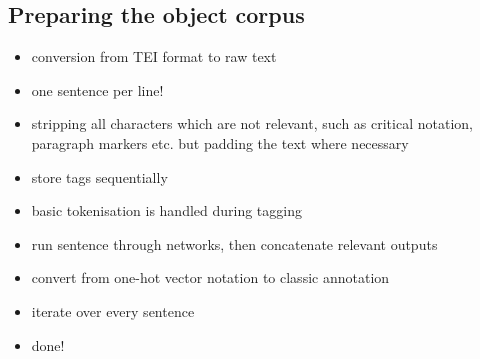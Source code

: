 \subsection{Preparing the object corpus}
\label{sec:createmodel}
\begin{itemize}
\item conversion from  TEI format to raw text
\item one sentence per line!
\item stripping all characters which are not relevant, such as
critical notation, paragraph markers etc. but padding the text where necessary
\item store tags sequentially
\item basic tokenisation is handled during tagging
\item run sentence through networks, then concatenate relevant outputs
\item convert from one-hot vector notation to classic annotation
\item iterate over every sentence
\item done!
\end{itemize}